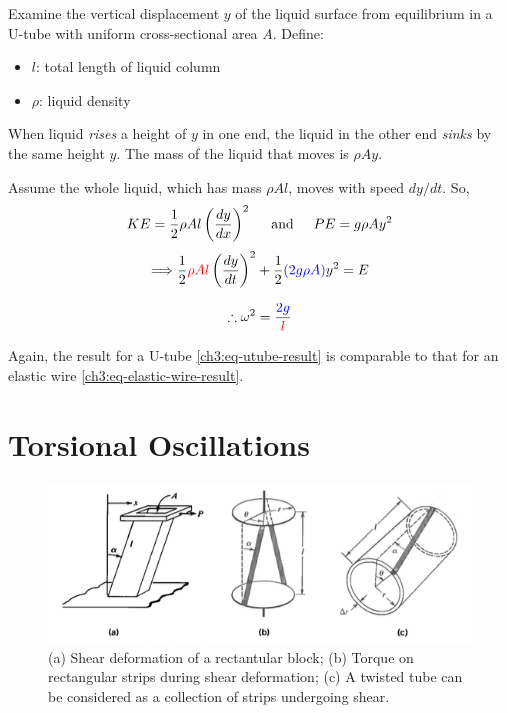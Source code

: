 \documentclass[11pt,letterpaper,titlepage,oneside]{book}
\newcommand{\htab}{\hspace{0.5cm}}
\newcommand{\andd}{\htab\text{and}\htab}
\newcommand{\kcol}[1]{\textcolor{blue}{#1}}
\newcommand{\mcol}[1]{\textcolor{red}{#1}}
\begin{document}
Examine the vertical displacement $y$ of the liquid surface from equilibrium in a U-tube with uniform cross-sectional area $A$. Define:
\begin{itemize}
	\item $l$: total length of liquid column
	\item $\rho$: liquid density
\end{itemize}

When liquid \textit{rises} a height of $y$ in one end, the liquid in the other end \textit{sinks} by the same height $y$. The mass of the liquid that moves is $\rho Ay$. 

Assume the whole liquid, which has mass $\rho Al$, moves with speed $dy/dt$. So,
\[ KE = \frac{1}{2} \rho Al \left(\frac{dy}{dx}\right)^2 \andd
PE = g\rho Ay^2 \]
\[ \Longrightarrow \frac{1}{2} \mcol{\rho Al} \left( \frac{dy}{dt} \right)^2 
+ \frac{1}{2} \kcol{(2g\rho A)} y^2 = E  \] 

\begin{equation}
\therefore \omega^2 = \frac{\kcol{2g}}{\mcol{l}} \label{ch3:eq-utube-result}
\end{equation}

Again, the result for a U-tube \eqref{ch3:eq-utube-result} is comparable to that for an elastic wire \eqref{ch3:eq-elastic-wire-result}.

\section{Torsional Oscillations} \label{ch3:sec-torsional}

\begin{figure}
	\centering
	\includegraphics[scale=0.7]{phys232/Ch3-shear-torsion.png} \caption{(a) Shear deformation of a rectantular block; (b) Torque on rectangular strips during shear deformation; (c) A twisted tube can be considered as a collection of strips undergoing shear.}\label{ch3:fig-shear-torsion}
\end{figure}
\end{document}
